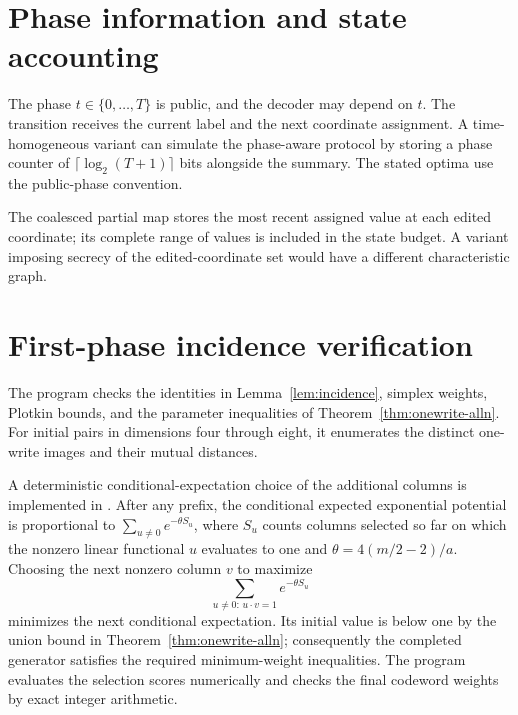 \documentclass[11pt,a4paper]{article}
\begin{document}
\section{Phase information and state accounting}
The phase $t\in\{0,\ldots,T\}$ is public, and the decoder may depend on $t$. The transition receives the current label and the next coordinate assignment. A time-homogeneous variant can simulate the phase-aware protocol by storing a phase counter of $\lceil\log_2(T+1)\rceil$ bits alongside the summary. The stated optima use the public-phase convention.

The coalesced partial map stores the most recent assigned value at each edited coordinate; its complete range of values is included in the state budget. A variant imposing secrecy of the edited-coordinate set would have a different characteristic graph.

\section{First-phase incidence verification}
The program  checks the identities in Lemma~\ref{lem:incidence}, simplex weights, Plotkin bounds, and the parameter inequalities of Theorem~\ref{thm:onewrite-alln}. For initial pairs in dimensions four through eight, it enumerates the distinct one-write images and their mutual distances.

A deterministic conditional-expectation choice of the additional columns is implemented in . After any prefix, the conditional expected exponential potential is proportional to $\sum_{u\ne0}e^{-\theta S_u}$, where $S_u$ counts columns selected so far on which the nonzero linear functional $u$ evaluates to one and $\theta=4(m/2-2)/a$. Choosing the next nonzero column $v$ to maximize
\[
 \sum_{u\ne0:\,u\cdot v=1}e^{-\theta S_u}
\]
minimizes the next conditional expectation. Its initial value is below one by the union bound in Theorem~\ref{thm:onewrite-alln}; consequently the completed generator satisfies the required minimum-weight inequalities. The program evaluates the selection scores numerically and checks the final codeword weights by exact integer arithmetic.
\end{document}
